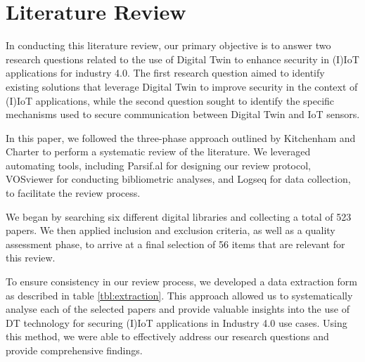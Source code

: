                 

\chapter{Literature Review} 
\label{Chapter3} %
In conducting this literature review, our primary objective is to answer two research questions related to the use of Digital Twin to enhance security in (I)IoT applications for industry 4.0. The first research question aimed to identify existing solutions that leverage Digital Twin to improve security in the context of (I)IoT applications, while the second question sought to identify the specific mechanisms used to secure communication between Digital Twin and IoT sensors.

In this paper, we followed the three-phase approach outlined by Kitchenham and Charter \cite{kitchenham_guidelines_2007} to perform a systematic review of the literature. We leveraged automating tools, including Parsif.al for designing our review protocol, VOSviewer for conducting bibliometric analyses, and Logseq for data collection, to facilitate the review process.

We began by searching six different digital libraries and collecting a total of 523 papers. We then applied inclusion and exclusion criteria, as well as a quality assessment phase, to arrive at a final selection of 56 items that are relevant for this review.

To ensure consistency in our review process, we developed a data extraction form as described in table \ref{tbl:extraction}. This approach allowed us to systematically analyse each of the selected papers and provide valuable insights into the use of DT technology for securing (I)IoT applications in Industry 4.0 use cases. Using this method, we were able to effectively address our research questions and provide comprehensive findings.









